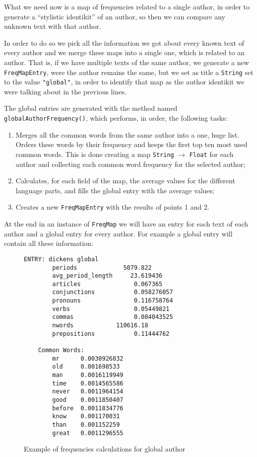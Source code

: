 \documentclass[a4paper,11pt, twoside]{article}
\begin{document}
		\bigskip

		\noindent
		What we need now is a map of frequencies related to a single author, in order to generate a ``stylistic identikit''  of an author, so then we can compare any unknown text with that author.

		\noindent
		In order to do so we pick all the information we got about every known text of every author and we merge these maps into a single one, which is related to an author. That is, if we have multiple texts of the same author, we generate a new \lstinline|FreqMapEntry|, were the author remains the same, but we set as title a \lstinline|String| set to the value \lstinline|"global"|, in order to identify that map as the author identikit we were talking about in the previous lines.

		\bigskip
		\noindent
		The global entries are generated with the method named \lstinline|globalAuthorFrequency()|, which performs, in order, the following tasks: 
		\begin{enumerate}
			\item Merges all the common words from the same author into a one, huge list. Orders these words by their frequency and keeps the first top ten most used common words. This is done creating a map \lstinline|String| $\to$ \lstinline|Float| for each author and collecting each common word frequency for the selected author;
			\item Calculates, for each field of the map, the average values for the different language parts, and fills the global entry with the average values;
			\item Creates a new \lstinline|FreqMapEntry| with the results of points 1 and 2.
		\end{enumerate}

		\bigskip
		\noindent
		At the end in an instance of \lstinline|FreqMap| we will have an entry for each text of each author and a global entry for every author. For example a global entry will contain all these information:
		\begin{figure}[h!]
			\centering
			\begin{BVerbatim}[fontsize=\footnotesize]
	ENTRY: dickens global
		periods             5079.822
		avg_period_length     23.619436
		articles               0.067365
		conjunctions           0.058276057
		pronouns               0.116758764
		verbs                  0.05449821
		commas                 0.084043525
		nwords            110616.18
		prepositions           0.11444762
	
	Common Words:
		mr      0.0030926832
		old     0.001698533
		man     0.0016119949
		time    0.0014565586
		never   0.0011964154
		good    0.0011850407
		before  0.0011834776
		know    0.001170031
		than    0.001152259
		great   0.0011296555
		\end{BVerbatim}
		\caption{Example of frequencies calculations for global author}
		\label{fig:freq-auth}
	\end{figure}
\end{document}
